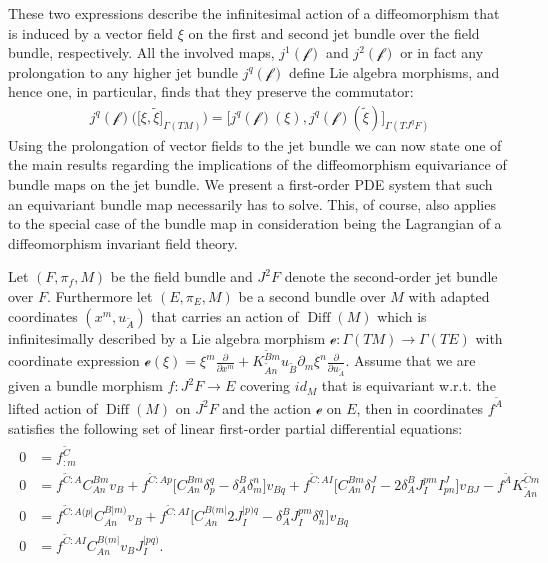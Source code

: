 These two expressions describe the infinitesimal action of a diffeomorphism that is induced by a vector field $\xi$ on the first and second jet bundle over the field bundle, respectively. 
All the involved maps, $j^1(\mathcal{f})$ and $j^2(\mathcal{f})$ or in fact any prolongation to any higher jet bundle $j^q(\mathcal{f})$ define Lie algebra morphisms, and hence one, in particular, finds that they preserve the commutator:
\begin{align}
j^q (\mathcal{f})\bigl (  \bigl [\xi, \tilde{\xi}  \bigr ]_{\Gamma(TM)}\bigr) =  \bigl [ j^q(\mathcal{f})(\xi), j^q(\mathcal{f})(\tilde{\xi}) \bigr ]_{\Gamma(TJ^qF)}
\end{align}
Using the prolongation of vector fields to the jet bundle we can now state one of the main results regarding the implications of the diffeomorphism equivariance of bundle maps on the jet bundle. We present a first-order PDE system that
such an equivariant bundle map necessarily has to solve. 
This, of course, also applies to the special case of the bundle map in consideration being
the Lagrangian of a diffeomorphism invariant field theory. 
\begin{theorem}
Let $(F,\pi_f,M)$ be the field bundle and $J^2F$ denote the second-order jet bundle over $F$. Furthermore let $(E, \pi_E, M)$ be a second bundle over $M$ with adapted coordinates $(x^m, u_{\tilde{A}})$ that carries an action of $\operatorname{Diff}(M)$ which is infinitesimally described by a Lie algebra morphism $\mathcal{e}: \Gamma(TM) \rightarrow \Gamma(TE)$ with coordinate expression $\mathcal{e}(\xi) = \xi^m \frac{\partial}{\partial x^m} + K_{\tilde{A}n}^{\tilde{B}m} u_{\tilde{B}} \partial_m \xi^n \frac{\partial}{\partial u_{\tilde{A}}}$. Assume that we are given a bundle morphism $f : J^2F \rightarrow E$ covering $id_M$ that is equivariant w.r.t. the lifted action of $\operatorname{Diff}(M)$ on $J^2F$ and the action $\mathcal{e}$ on $E$, then in coordinates $f^{\tilde{A}}$ satisfies the following set of linear first-order partial differential equations:
\begin{align}
\begin{aligned}
    0 &= f^{\tilde{C}}_{:m} \\
    0 &= f^{\tilde{C}:A} C_{An}^{Bm} v_B + f^{\tilde{C}:Ap} \bigl[ C_{An}^{Bm} \delta_p^q - \delta_A^B \delta_m^n \bigr] v_{Bq} + f^{\tilde{C}:AI} \bigl[ C_{An}^{Bm} \delta_I^J - 2 \delta_A^B J_I^{pm} I^J_{pn}  \bigr] v_{BJ} - f^{\tilde{A}}K_{\tilde{A}n}^{\tilde{C}m}\\
    0 &= f^{\tilde{C}:A(p\vert}C_{An}^{B \vert m)} v_B + f^{\tilde{C}: AI} \bigl[ C_{An}^{B(m\vert} 2 J_I^{\vert p) q} - \delta^B_A J_I ^{pm} \delta_n^q \bigr] v_{Bq} \\
    0 &= f^{\tilde{C}:AI} C_{An}^{B(m\vert} v_B J_I^{\vert p q )}.
\end{aligned}
\end{align}
\end{theorem}
